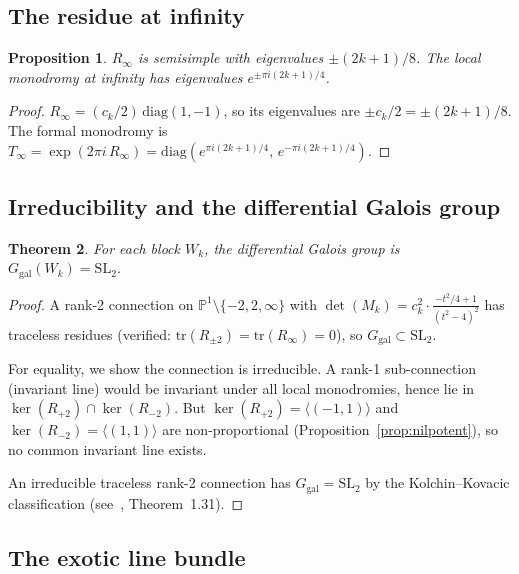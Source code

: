 \documentclass[11pt]{article}
\theoremstyle{plain}
\newtheorem{theorem}{Theorem}[section]
\newtheorem{proposition}[theorem]{Proposition}
\theoremstyle{definition}
\theoremstyle{remark}
\newcommand{\SL}{\mathrm{SL}}
\newcommand{\tr}{\mathrm{tr}}
\newcommand{\Ggal}{G_{\mathrm{gal}}}
\begin{document}
\subsection{The residue at infinity}

\begin{proposition}\label{prop:Rinfty}
$R_\infty$ is semisimple with eigenvalues $\pm(2k+1)/8$. The
local monodromy at infinity has eigenvalues
$e^{\pm \pi i(2k+1)/4}$.
\end{proposition}

\begin{proof}
$R_\infty = (c_k/2)\, \mathrm{diag}(1,-1)$, so its eigenvalues are
$\pm c_k/2 = \pm(2k+1)/8$. The formal monodromy is
$T_\infty = \exp(2\pi i\, R_\infty) = \mathrm{diag}(e^{\pi i(2k+1)/4},
\, e^{-\pi i(2k+1)/4})$.
\end{proof}

\subsection{Irreducibility and the differential Galois group}

\begin{theorem}\label{thm:SL2}
For each block $W_k$, the differential Galois group is
$\Ggal(W_k) = \SL_2$.
\end{theorem}

\begin{proof}
A rank-2 connection on $\mathbb{P}^1 \setminus \{-2,2,\infty\}$ with
$\det(M_k) = c_k^2 \cdot \frac{-t^2/4 + 1}{(t^2-4)^2}$ has traceless
residues (verified: $\tr(R_{\pm 2}) = \tr(R_\infty) = 0$), so
$\Ggal \subset \SL_2$.

For equality, we show the connection is irreducible. A rank-1
sub-connection (invariant line) would be invariant under all local
monodromies, hence lie in $\ker(R_{+2}) \cap \ker(R_{-2})$. But
$\ker(R_{+2}) = \langle(-1,1)\rangle$ and $\ker(R_{-2}) = \langle(1,1)%
\rangle$ are non-proportional (Proposition~\ref{prop:nilpotent}),
so no common invariant line exists.

An irreducible traceless rank-2 connection has $\Ggal = \SL_2$
by the Kolchin--Kovacic classification
(see~\cite{PS2003}, Theorem~1.31).
\end{proof}

\subsection{The exotic line bundle}
\end{document}
